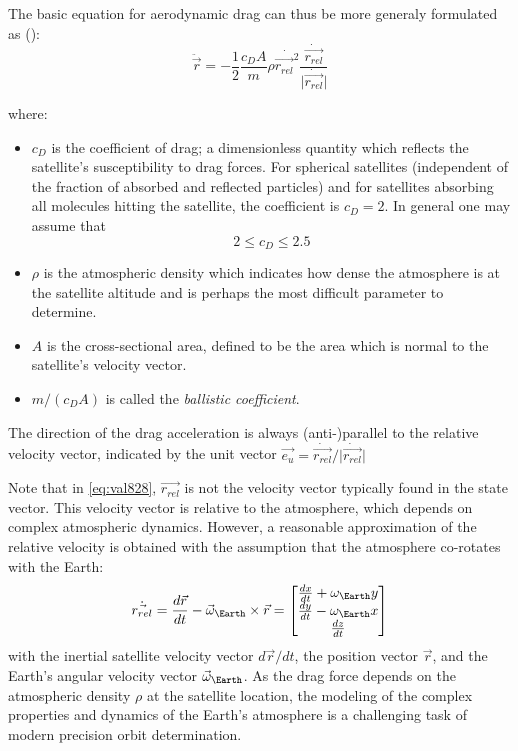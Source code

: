 The basic equation for aerodynamic drag can thus be more generaly formulated as (\cite{Vallado}):
\begin{equation}
    \label{eq:val828}
    \ddot{\vec{r}} = -\frac{1}{2} \frac{c_D A}{m} \rho 
    \dot{\vec{r_{rel}}^2} 
    \frac{\dot{\vec{r_{rel}}}}{\lvert \dot{\vec{r_{rel}}} \rvert}
\end{equation}

where:
\begin{itemize}
    \item \(c_D\) is the coefficient of drag; a dimensionless quantity which reflects 
    the satellite's susceptibility to drag forces. For spherical satellites (independent of the
fraction of absorbed and reﬂected particles) and for satellites absorbing all
molecules hitting the satellite, the coefficient is \(c_D = 2\). In general one may assume 
that \cite{BeutlerVII}
\begin{equation}
    2 \leq c_D \leq 2.5
\end{equation}
    \item \(\rho\) is the atmospheric density which indicates how dense the atmosphere 
    is at the satellite altitude and is perhaps the most difficult parameter to determine.
    \item \(A\) is the cross-sectional area, defined to be the area which is normal 
    to the satellite's velocity vector.
    \item \(m/(c_D A)\) is called the \emph{ballistic coefficient}.
\end{itemize}
The direction of the drag acceleration is always (anti-)parallel to the relative 
velocity vector, indicated by the unit vector 
\(\vec{e_u} = \dot{\vec{r_{rel}}} / \lvert \dot{\vec{r_{rel}}} \rvert \)

Note that in \ref{eq:val828}, \(\vec{r_{rel}}\) is not the velocity vector 
typically found in the state vector. This velocity vector is relative to the 
atmosphere, which depends on complex atmospheric dynamics. However, a reasonable 
approximation of the relative velocity is obtained with the assumption that the 
atmosphere co-rotates with the Earth:
\begin{equation}
    \dot{\vec{r_{rel}}} = \frac{d\vec{r}}{dt} - \vec{\omega}_{\Earth} \times \vec{r} = 
        \begin{bmatrix}
        \frac{dx}{dt}+{\omega}_{\Earth}y \\
        \frac{dy}{dt}-{\omega}_{\Earth}x \\
        \frac{dz}{dt}
        \end{bmatrix}
\end{equation}
with the inertial satellite velocity vector \(d\vec{r}/{dt}\), the position vector 
\(\vec{r}\), and the Earth's angular velocity vector \(\vec{\omega}_{\Earth}\). 
As the drag force depends on the atmospheric density \(\rho\) at the satellite 
location, the modeling of the complex properties and dynamics of the Earth's 
atmosphere is a challenging task of modern precision orbit determination.

